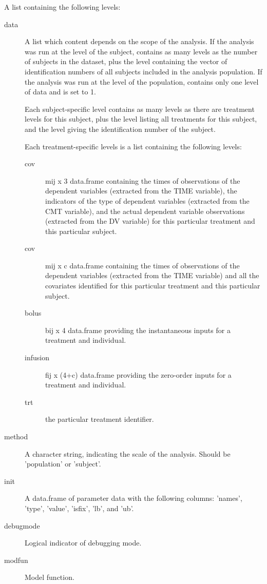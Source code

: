 \begin{Arguments}
\begin{ldescription}
\item[\code{problem}] A list containing the following levels:\begin{description}

\item[data] A list which content depends on the scope of the analysis. If 
the analysis was run at the level of the subject,  contains as 
many levels as the number of subjects in the dataset, plus the 
level containing the vector of identification numbers of all subjects 
included in the analysis population. If the analysis was run at the level 
of the population,  contains only one level of data and 
 is set to 1.

Each subject-specific level contains as many levels as there are treatment
levels for this subject, plus the  level listing all treatments
for this subject, and the  level giving the identification number
of the subject. 

Each treatment-specific levels is a list containing the following levels: 
\begin{description}

\item[cov] mij x 3 data.frame containing the times of observations of the
dependent variables (extracted from the TIME variable), the indicators
of the type of dependent variables (extracted from the CMT variable),
and the actual dependent variable observations (extracted from the 
DV variable) for this particular treatment and this particular 
subject.
\item[cov] mij x c data.frame containing the times of observations of 
the dependent variables (extracted from the TIME variable) and all the
covariates identified for this particular treatment and this 
particular subject.
\item[bolus] bij x 4 data.frame providing the instantaneous inputs for
a treatment and individual.
\item[infusion] fij x (4+c) data.frame providing the zero-order inputs for
a treatment and individual.
\item[trt] the particular treatment identifier.
\end{description}


\item[method] A character string, indicating the scale of the analysis. Should
be 'population' or 'subject'.
\item[init] A data.frame of parameter data with the following columns:
'names', 'type', 'value', 'isfix', 'lb', and 'ub'.
\item[debugmode] Logical indicator of debugging mode.
\item[modfun] Model function.


\end{description}
\end{ldescription}
\end{Arguments}
